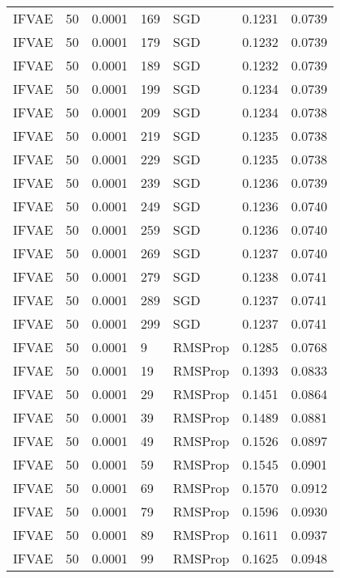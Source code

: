 \begin{tabular}{llrllrr}
 IFVAE &   50 &  0.0001 &   169 &       SGD &  0.1231 &       0.0739 \\
 IFVAE &   50 &  0.0001 &   179 &       SGD &  0.1232 &       0.0739 \\
 IFVAE &   50 &  0.0001 &   189 &       SGD &  0.1232 &       0.0739 \\
 IFVAE &   50 &  0.0001 &   199 &       SGD &  0.1234 &       0.0739 \\
 IFVAE &   50 &  0.0001 &   209 &       SGD &  0.1234 &       0.0738 \\
 IFVAE &   50 &  0.0001 &   219 &       SGD &  0.1235 &       0.0738 \\
 IFVAE &   50 &  0.0001 &   229 &       SGD &  0.1235 &       0.0738 \\
 IFVAE &   50 &  0.0001 &   239 &       SGD &  0.1236 &       0.0739 \\
 IFVAE &   50 &  0.0001 &   249 &       SGD &  0.1236 &       0.0740 \\
 IFVAE &   50 &  0.0001 &   259 &       SGD &  0.1236 &       0.0740 \\
 IFVAE &   50 &  0.0001 &   269 &       SGD &  0.1237 &       0.0740 \\
 IFVAE &   50 &  0.0001 &   279 &       SGD &  0.1238 &       0.0741 \\
 IFVAE &   50 &  0.0001 &   289 &       SGD &  0.1237 &       0.0741 \\
 IFVAE &   50 &  0.0001 &   299 &       SGD &  0.1237 &       0.0741 \\
 IFVAE &   50 &  0.0001 &     9 &   RMSProp &  0.1285 &       0.0768 \\
 IFVAE &   50 &  0.0001 &    19 &   RMSProp &  0.1393 &       0.0833 \\
 IFVAE &   50 &  0.0001 &    29 &   RMSProp &  0.1451 &       0.0864 \\
 IFVAE &   50 &  0.0001 &    39 &   RMSProp &  0.1489 &       0.0881 \\
 IFVAE &   50 &  0.0001 &    49 &   RMSProp &  0.1526 &       0.0897 \\
 IFVAE &   50 &  0.0001 &    59 &   RMSProp &  0.1545 &       0.0901 \\
 IFVAE &   50 &  0.0001 &    69 &   RMSProp &  0.1570 &       0.0912 \\
 IFVAE &   50 &  0.0001 &    79 &   RMSProp &  0.1596 &       0.0930 \\
 IFVAE &   50 &  0.0001 &    89 &   RMSProp &  0.1611 &       0.0937 \\
 IFVAE &   50 &  0.0001 &    99 &   RMSProp &  0.1625 &       0.0948 \\

\end{tabular}
